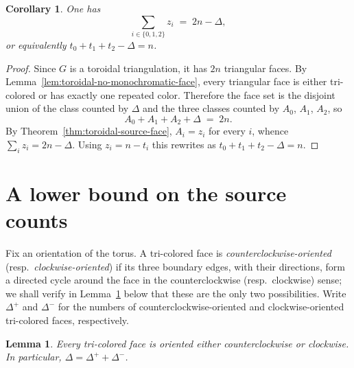 \documentclass[11pt]{amsart}
\newcommand{\Zthree}{\{0,1,2\}}
\theoremstyle{plain}
\newtheorem{lemma}[theorem]{Lemma}
\newtheorem{corollary}[theorem]{Corollary}
\theoremstyle{definition}
\theoremstyle{remark}
\begin{document}
\begin{corollary}
\label{cor:toroidal-total-source}
One has
\[
  \sum_{i \in \Zthree} z_i \;=\; 2n - \Delta,
\]
or equivalently $t_0 + t_1 + t_2 - \Delta = n$.
\end{corollary}

\begin{proof}
Since $G$ is a toroidal triangulation, it has $2n$ triangular faces. By Lemma~\ref{lem:toroidal-no-monochromatic-face}, every triangular face is either tri-colored or has exactly one repeated color. Therefore the face set is the disjoint union of the class counted by $\Delta$ and the three classes counted by $A_0$, $A_1$, $A_2$, so
\[
  A_0 + A_1 + A_2 + \Delta \;=\; 2n.
\]
By Theorem~\ref{thm:toroidal-source-face}, $A_i = z_i$ for every $i$, whence $\sum_i z_i = 2n - \Delta$. Using $z_i = n - t_i$ this rewrites as $t_0 + t_1 + t_2 - \Delta = n$.
\end{proof}


\section{A lower bound on the source counts}
\label{sec:toroidal-lower-bound}

Fix an orientation of the torus. A tri-colored face is \emph{counterclockwise-oriented} \textup{(}resp.\ \emph{clockwise-oriented}\textup{)} if its three boundary edges, with their directions, form a directed cycle around the face in the counterclockwise \textup{(}resp.\ clockwise\textup{)} sense; we shall verify in Lemma~\ref{lem:tricolored-directed} below that these are the only two possibilities. Write $\Delta^+$ and $\Delta^-$ for the numbers of counterclockwise-oriented and clockwise-oriented tri-colored faces, respectively.

\begin{lemma}
\label{lem:tricolored-directed}
Every tri-colored face is oriented either counterclockwise or clockwise. In particular, $\Delta = \Delta^+ + \Delta^-$.
\end{lemma}
\end{document}
